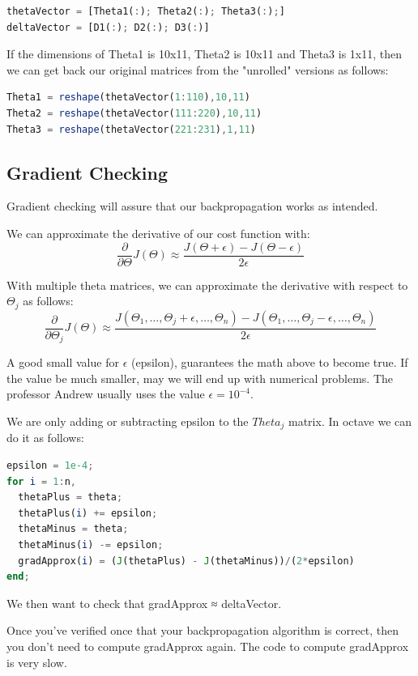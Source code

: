 \documentclass{article}
\begin{document}
\begin{lstlisting}[language=Octave]
thetaVector = [Theta1(:); Theta2(:); Theta3(:);]
deltaVector = [D1(:); D2(:); D3(:)]
\end{lstlisting}

If the dimensions of Theta1 is 10x11, Theta2 is 10x11 and Theta3 is 1x11, then we can get back our original matrices from the "unrolled" versions as follows:

\begin{lstlisting}[language=Octave]
Theta1 = reshape(thetaVector(1:110),10,11)
Theta2 = reshape(thetaVector(111:220),10,11)
Theta3 = reshape(thetaVector(221:231),1,11)
\end{lstlisting}

\subsection{Gradient Checking}
Gradient checking will assure that our backpropagation works as intended.

We can approximate the derivative of our cost function with:
$$\dfrac{\partial}{\partial\Theta}J(\Theta) \approx \dfrac{J(\Theta + \epsilon) - J(\Theta - \epsilon)}{2\epsilon}$$

With multiple theta matrices, we can approximate the derivative with respect to $\Theta_j$ as follows:
$$\dfrac{\partial}{\partial\Theta_j}J(\Theta) \approx \dfrac{J(\Theta_1, \dots, \Theta_j + \epsilon, \dots, \Theta_n) - J(\Theta_1, \dots, \Theta_j - \epsilon, \dots, \Theta_n)}{2\epsilon}$$

A good small value for ${\epsilon}$ (epsilon), guarantees the math above to become true. If the value be much smaller, may we will end up with numerical problems. The professor Andrew usually uses the value ${\epsilon = 10^{-4}}$.

We are only adding or subtracting epsilon to the $Theta_j$ matrix. In octave we can do it as follows:

\begin{lstlisting}[language=Octave]
epsilon = 1e-4;
for i = 1:n,
  thetaPlus = theta;
  thetaPlus(i) += epsilon;
  thetaMinus = theta;
  thetaMinus(i) -= epsilon;
  gradApprox(i) = (J(thetaPlus) - J(thetaMinus))/(2*epsilon)
end;
\end{lstlisting}

We then want to check that gradApprox ≈ deltaVector.

Once you've verified once that your backpropagation algorithm is correct, then you don't need to compute gradApprox again. The code to compute gradApprox is very slow.
\end{document}
